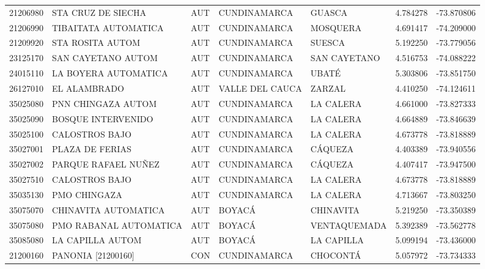 \begin{longtable}{rllllrr}
 21206980 &          STA CRUZ DE SIECHA &  AUT &     CUNDINAMARCA &            GUASCA &  4.784278 & -73.870806 \\
 21206990 &        TIBAITATA AUTOMATICA &  AUT &     CUNDINAMARCA &          MOSQUERA &  4.691417 & -74.209000 \\
 21209920 &            STA ROSITA AUTOM &  AUT &     CUNDINAMARCA &            SUESCA &  5.192250 & -73.779056 \\
 23125170 &          SAN CAYETANO AUTOM &  AUT &     CUNDINAMARCA &      SAN CAYETANO &  4.516753 & -74.088222 \\
 24015110 &        LA BOYERA AUTOMATICA &  AUT &     CUNDINAMARCA &             UBATÉ &  5.303806 & -73.851750 \\
 26127010 &                EL ALAMBRADO &  AUT &  VALLE DEL CAUCA &            ZARZAL &  4.410250 & -74.124611 \\
 35025080 &          PNN CHINGAZA AUTOM &  AUT &     CUNDINAMARCA &         LA CALERA &  4.661000 & -73.827333 \\
 35025090 &          BOSQUE INTERVENIDO &  AUT &     CUNDINAMARCA &         LA CALERA &  4.664889 & -73.846639 \\
 35025100 &              CALOSTROS BAJO &  AUT &     CUNDINAMARCA &         LA CALERA &  4.673778 & -73.818889 \\
 35027001 &             PLAZA DE FERIAS &  AUT &     CUNDINAMARCA &           CÁQUEZA &  4.403389 & -73.940556 \\
 35027002 &         PARQUE RAFAEL NUÑEZ &  AUT &     CUNDINAMARCA &           CÁQUEZA &  4.407417 & -73.947500 \\
 35027510 &              CALOSTROS BAJO &  AUT &     CUNDINAMARCA &         LA CALERA &  4.673778 & -73.818889 \\
 35035130 &                PMO CHINGAZA &  AUT &     CUNDINAMARCA &         LA CALERA &  4.713667 & -73.803250 \\
 35075070 &        CHINAVITA AUTOMATICA &  AUT &           BOYACÁ &         CHINAVITA &  5.219250 & -73.350389 \\
 35075080 &      PMO RABANAL AUTOMATICA &  AUT &           BOYACÁ &      VENTAQUEMADA &  5.392389 & -73.562778 \\
 35085080 &            LA CAPILLA AUTOM &  AUT &           BOYACÁ &        LA CAPILLA &  5.099194 & -73.436000 \\
 21200160 &          PANONIA [21200160] &  CON &     CUNDINAMARCA &          CHOCONTÁ &  5.057972 & -73.734333 \\

\end{longtable}
